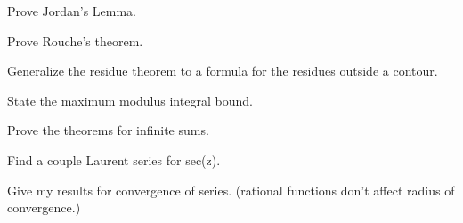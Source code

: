 Prove Jordan's Lemma.

Prove Rouche's theorem.

Generalize the residue theorem to a formula for the residues outside a 
contour.

State the maximum modulus integral bound.

Prove the theorems for infinite sums.

Find a couple Laurent series for sec(z).

Give my results for convergence of series.  (rational functions don't 
affect radius of convergence.)
